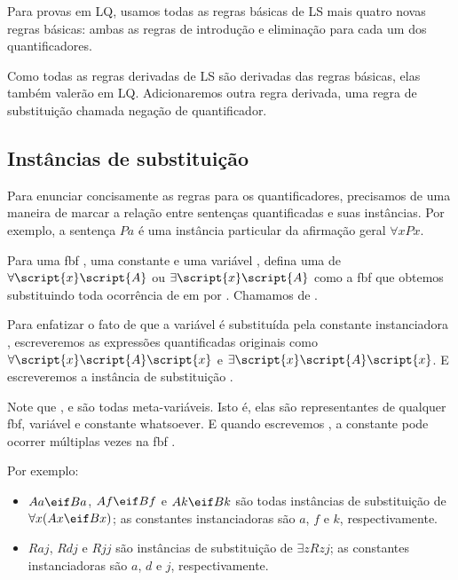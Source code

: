 Para provas em LQ, usamos todas as regras básicas de LS mais quatro novas regras básicas: ambas as regras de introdução e eliminação para cada um dos quantificadores.

Como todas as regras derivadas de LS são derivadas das regras básicas, elas também valerão em LQ. Adicionaremos outra regra derivada, uma regra de substituição chamada negação de quantificador.

\subsection{Instâncias de substituição}

Para enunciar concisamente as regras para os quantificadores, precisamos de uma maneira de marcar a relação entre sentenças quantificadas e suas instâncias. Por exemplo, a sentença $Pa$ é uma instância particular da afirmação geral $\forall x Px$.

Para uma fbf , uma constante  e uma variável , defina uma  de $\forall \script{x}\script{A}$ ou $\exists \script{x}\script{A}$ como a fbf que obtemos substituindo toda ocorrência de  em  por . Chamamos  de .

Para enfatizar o fato de que a variável  é substituída pela constante instanciadora , escreveremos as expressões quantificadas originais como $\forall \script{x}\script{A}\script{x}$ e $\exists \script{x}\script{A}\script{x}$. E escreveremos a instância de substituição .

Note que ,  e  são todas meta-variáveis. Isto é, elas são representantes de qualquer fbf, variável e constante whatsoever. E quando escrevemos , a constante  pode ocorrer múltiplas vezes na fbf .


Por exemplo:

\begin{itemize}
\item $Aa \eif Ba$, $Af \eif Bf$ e $Ak \eif Bk$ são todas instâncias de substituição de $\forall x(Ax \eif Bx)$; as constantes instanciadoras são $a$, $f$ e $k$, respectivamente.
\item $Raj$, $Rdj$ e $Rjj$ são instâncias de substituição de $\exists zRzj$; as constantes instanciadoras são $a$, $d$ e $j$, respectivamente.
\end{itemize}

